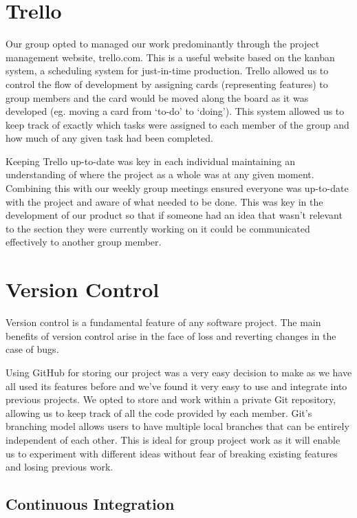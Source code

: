 \documentclass[11pt, a4paper]{report}
\begin{document}
\section{Trello}

Our group opted to managed our work predominantly through the project management website, trello.com. This is a useful website based on the kanban system, a scheduling system for just-in-time production. Trello allowed us to control the flow of development by assigning cards (representing features) to group members and the card would be moved along the board as it was developed (eg. moving a card from ‘to-do’ to ‘doing’). This system allowed us to keep track of exactly which tasks were assigned to each member of the group and how much of any given task had been completed. 

Keeping Trello up-to-date was key in each individual maintaining an understanding of where the project as a whole was at any given moment. Combining this with our weekly group meetings ensured everyone was up-to-date with the project and aware of what needed to be done. This was key in the development of our product so that if someone had an idea that wasn’t relevant to the section they were currently working on it could be communicated effectively to another group member.

\section{Version Control}

Version control is a fundamental feature of any software project. The main benefits of version  control arise in the face of loss and reverting changes in the case of bugs.

Using GitHub for storing our project was a very easy decision to make as we have all used its features before and we’ve found it very easy to use and integrate into previous projects. We opted to store and work within a private Git repository, allowing us to keep track of all the code provided by each member. Git's branching model allows users to have multiple local branches that can be entirely independent of each other. This is ideal for group project work as it will enable us to experiment with different ideas without fear of breaking existing features and losing previous work.

\subsection{Continuous Integration}
	 	 	 	 	
\end{document}
